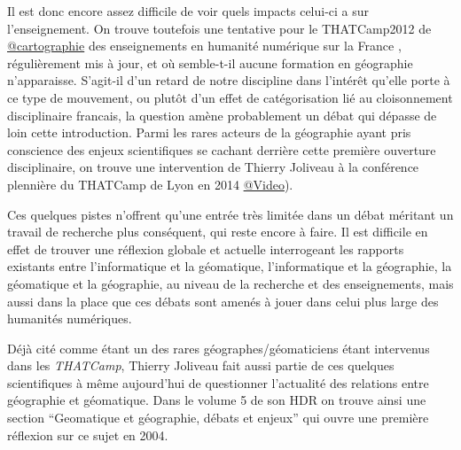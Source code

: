 Il est donc encore assez difficile de voir quels impacts celui-ci a sur l'enseignement. On trouve toutefois une tentative pour le THATCamp2012 de \href{http://pireh.univ-paris1.fr/DHfrancophone/index.php?rem&val=g%C3%A9ographie}{@cartographie} des enseignements en humanité numérique sur la France \autocites{Berra2012b,Clavaud2012}, régulièrement mis à jour, et où semble-t-il aucune formation en géographie n'apparaisse. S'agit-il d'un retard de notre discipline dans l'intérêt qu'elle porte à ce type de mouvement, ou plutôt d'un effet de catégorisation lié au cloisonnement disciplinaire francais, la question amène probablement un débat qui dépasse de loin cette introduction. Parmi les rares acteurs de la géographie ayant pris conscience des enjeux scientifiques se cachant derrière cette première ouverture disciplinaire, on trouve une intervention de Thierry Joliveau à la conférence plennière du THATCamp de Lyon en 2014 \href{http://dhlyon.hypotheses.org/587}{@Video}).

Ces quelques pistes n'offrent qu'une entrée très limitée dans un débat méritant un travail de recherche plus conséquent, qui reste encore à faire. Il est difficile en effet de trouver une réflexion globale et actuelle interrogeant les rapports existants entre l'informatique et la géomatique, l'informatique et la géographie, la géomatique et la géographie, au niveau de la recherche et des enseignements, mais aussi dans la place que ces débats sont amenés à jouer dans celui plus large des humanités numériques.


Déjà cité comme étant un des rares géographes/géomaticiens étant intervenus dans les \textit{THATCamp}, Thierry Joliveau fait aussi partie de ces quelques scientifiques à même aujourd'hui de questionner l'actualité des relations entre géographie et géomatique. Dans le volume 5 de son HDR on trouve ainsi une section \enquote{Geomatique et géographie, débats et enjeux} qui ouvre une première réflexion sur ce sujet en 2004.

